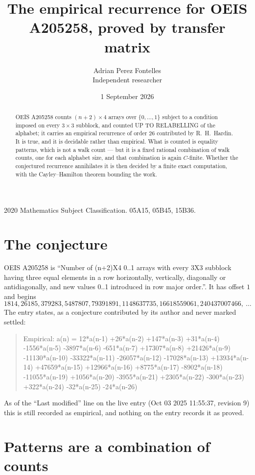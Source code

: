 \documentclass[11pt,a4paper]{article}
\title{The empirical recurrence for OEIS A205258, proved by transfer matrix}
\author{Adrian Perez Fontelles\\ \small Independent researcher}
\date{1 September 2026}
\theoremstyle{plain}
\theoremstyle{definition}
\begin{document}
\maketitle

\begin{abstract}
OEIS A205258 counts $(n+2)\times4$ arrays over $\{0,\dots,1\}$ subject to a condition imposed on
every $3\times3$ subblock, and counted UP TO RELABELLING of the
alphabet; it carries an empirical recurrence of order $26$ contributed by
R.~H.~Hardin. It is true, and it is decidable rather than empirical. What is counted is
equality patterns, which is not a walk count --- but it is a fixed rational combination of
walk counts, one for each alphabet size, and that combination is again $C$-finite. Whether the
conjectured recurrence annihilates it is then decided by a finite exact computation, with the
Cayley--Hamilton theorem bounding the work.
\end{abstract}

\noindent\small 2020 Mathematics Subject Classification. 05A15, 05B45, 15B36.\normalsize

\section{The conjecture}

OEIS A205258 is ``Number of (n+2)X4 0..1 arrays with every 3X3 subblock having three equal elements in a row horizontally, vertically, diagonally or antidiagonally, and new values 0..1 introduced in row major order.''. It has offset $1$ and begins
\[
1814, 26185, 379283, 5487807, 79391891, 1148637735, 16618559061, 240437007466,\ \dots
\]
The entry states, as a conjecture contributed by its author and never marked settled:
\begin{quote}
Empirical: a(n) = 12*a(n-1) +26*a(n-2) +147*a(n-3) +31*a(n-4) -1556*a(n-5) -3897*a(n-6) -651*a(n-7) +17307*a(n-8) +21426*a(n-9) -11130*a(n-10) -33322*a(n-11) -26057*a(n-12) -17028*a(n-13) +13934*a(n-14) +47659*a(n-15) +12966*a(n-16) +8775*a(n-17) -8902*a(n-18) -11055*a(n-19) +1056*a(n-20) -3955*a(n-21) +2305*a(n-22) -300*a(n-23) +322*a(n-24) -32*a(n-25) -24*a(n-26)
\end{quote}
As of the ``Last modified'' line on the live entry (Oct 03 2025 11:55:37, revision 9) this is still
recorded as empirical, and nothing on the entry records it as proved.

\section{Patterns are a combination of counts}
\end{document}
